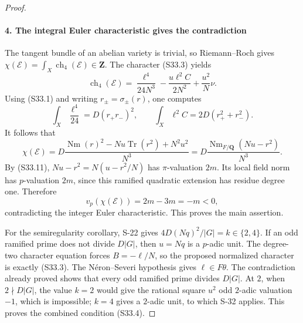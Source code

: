 \begin{proof}
\paragraph{4. The integral Euler characteristic gives the contradiction}

The tangent bundle of an abelian variety is trivial, so Riemann--Roch gives \(\chi(\mathcal E)=\int_X\operatorname{ch}_4(\mathcal E)\in\mathbf Z\). The character (S33.3) yields \[
 \operatorname{ch}_4(\mathcal E)
 =\frac{\ell^4}{24N^3}
       -\frac{u\ell^2C}{2N^2}+\frac{u^2}{N}\nu.
\] Using (S33.1) and writing \(r_\pm=\sigma_\pm(r)\), one computes \[
 \int_X\frac{\ell^4}{24}=D(r_+r_-)^2,
 \qquad
 \int_X\ell^2C=2D(r_+^2+r_-^2).
\] It follows that \[
 \chi(\mathcal E)
 =D\frac{\operatorname{Nm}(r)^2-Nu\operatorname{Tr}(r^2)+N^2u^2}{N^3}
 =D\frac{\operatorname{Nm}_{F/\mathbf Q}(Nu-r^2)}{N^3}.
 \tag{S33.12}
\] By (S33.11), \(Nu-r^2=N(u-r^2/N)\) has \(\pi\)-valuation \(2m\). Its local field norm has \(p\)-valuation \(2m\), since this ramified quadratic extension has residue degree one. Therefore \[
 v_p(\chi(\mathcal E))=2m-3m=-m<0,
 \tag{S33.13}
\] contradicting the integer Euler characteristic. This proves the main assertion.

For the semiregularity corollary, S-22 gives \(4D(Nq)^2/|G|=k\in\{2,4\}\). If an odd ramified prime does not divide \(D|G|\), then \(u=Nq\) is a \(p\)-adic unit. The degree-two character equation forces \(B=-\ell/N\), so the proposed normalized character is exactly (S33.3). The Néron--Severi hypothesis gives \(\ell\in F\theta\). The contradiction already proved shows that every odd ramified prime divides \(D|G|\). At \(2\), when \(2\nmid D|G|\), the value \(k=2\) would give the rational square \(u^2\) odd \(2\)-adic valuation \(-1\), which is impossible; \(k=4\) gives a \(2\)-adic unit, to which S-32 applies. This proves the combined condition (S33.4).
\end{proof}
